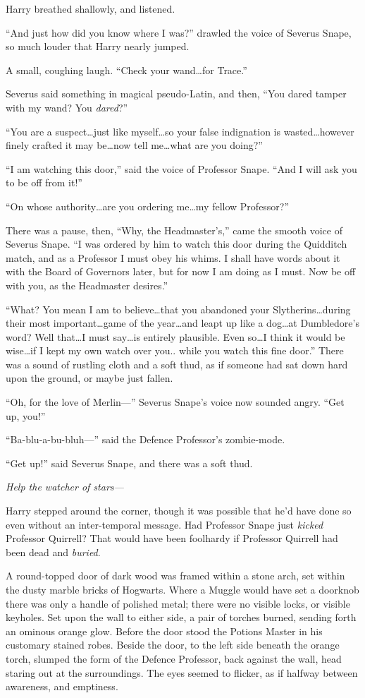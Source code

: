 Harry breathed shallowly, and listened.

“And just how did you know where I was?” drawled the voice of Severus Snape, so much louder that Harry nearly jumped.

A small, coughing laugh. “Check your wand…for Trace.”

Severus said something in magical pseudo-Latin, and then, “You dared tamper with my wand? You \emph{dared}?”

“You are a suspect…just like myself…so your false indignation is wasted…however finely crafted it may be…now tell me…what are you doing?”

“I am watching this door,” said the voice of Professor Snape. “And I will ask you to be off from it!”

“On whose authority…are you ordering me…my fellow Professor?”

There was a pause, then, “Why, the Headmaster’s,” came the smooth voice of Severus Snape. “I was ordered by him to watch this door during the Quidditch match, and as a Professor I must obey his whims. I shall have words about it with the Board of Governors later, but for now I am doing as I must. Now be off with you, as the Headmaster desires.”

“What? You mean I am to believe…that you abandoned your Slytherins…during their most important…game of the year…and leapt up like a dog…at Dumbledore’s word? Well that…I must say…is entirely plausible. Even so…I think it would be wise…if I kept my own watch over you.. while you watch this fine door.” There was a sound of rustling cloth and a soft thud, as if someone had sat down hard upon the ground, or maybe just fallen.

“Oh, for the love of Merlin—” Severus Snape’s voice now sounded angry. “Get up, you!”

“Ba-blu-a-bu-bluh—” said the Defence Professor’s zombie-mode.

“Get up!” said Severus Snape, and there was a soft thud.

\emph{Help the watcher of stars—}

Harry stepped around the corner, though it was possible that he’d have done so even without an inter-temporal message. Had Professor Snape just \emph{kicked} Professor Quirrell? That would have been foolhardy if Professor Quirrell had been dead and \emph{buried}.

A round-topped door of dark wood was framed within a stone arch, set within the dusty marble bricks of Hogwarts. Where a Muggle would have set a doorknob there was only a handle of polished metal; there were no visible locks, or visible keyholes. Set upon the wall to either side, a pair of torches burned, sending forth an ominous orange glow. Before the door stood the Potions Master in his customary stained robes. Beside the door, to the left side beneath the orange torch, slumped the form of the Defence Professor, back against the wall, head staring out at the surroundings. The eyes seemed to flicker, as if halfway between awareness, and emptiness.

